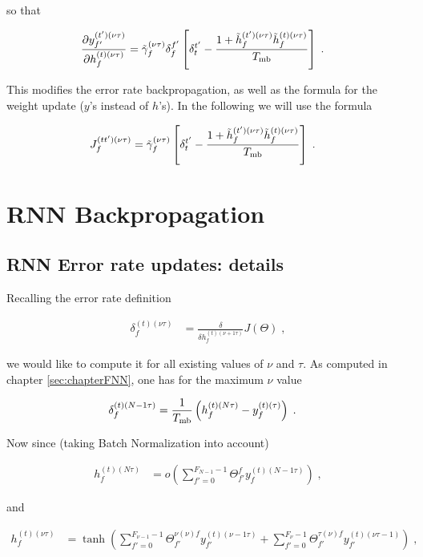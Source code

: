 \begin{subappendices}
so that

\begin{align}
\frac{\partial y_{f'}^{(t')(\nu\tau)}}{\partial h_{f}^{(t)(\nu\tau)}}&=
%
\tilde{\gamma}^{(\nu\tau)}_f \delta^{f'}_f\left[\delta^{t'}_t-
%
\frac{1+\tilde{h}_{f}^{(t')(\nu\tau)}\tilde{h}_{f}^{(t)(\nu\tau)}}{T_{{\rm mb}}}\right]\;.
\end{align}

This modifies the error rate backpropagation, as well as the formula for the weight update ($y$'s instead of $h$'s). In the following we will use the formula

\begin{align}
J^{(tt')(\nu\tau)}_{f}&=
%
\tilde{\gamma}^{(\nu\tau)}_f \left[\delta^{t'}_t-
%
\frac{1+\tilde{h}_{f}^{(t')(\nu\tau)}\tilde{h}_{f}^{(t)(\nu\tau)}}{T_{{\rm mb}}}\right]\;.
\end{align}


\section{RNN Backpropagation}

\subsection{RNN Error rate updates: details} \label{sec:rnnappenderrorrate}

Recalling the error rate definition

\begin{align}
\delta^{(t)( \nu\tau)}_f&=\frac{\delta}{\delta h^{(t)( \nu+1\tau)}_f }J(\Theta)\;,
\end{align}

we would like to compute it for all existing values of $\nu$ and $\tau$. As computed in chapter \ref{sec:chapterFNN}, one has for the maximum $\nu$ value

\begin{align}
\delta^{(t)(N-1\tau)}_f&= \frac{1}{T_{{\rm mb}}}\left(h_{f}^{(t)(N\tau)}-y_f^{(t)(\tau)}\right)\;.
\end{align}

Now since (taking Batch Normalization into account)

\begin{align}
h^{(t)(N\tau)}_{f}&=o\left(\sum_{f'=0}^{F_{N-1}-1}\Theta^f_{f'} y^{(t)(N-1\tau)}_{f}\right)\;,
\end{align}

and 

\begin{align}
h^{(t)(\nu\tau)}_f&=\tanh\left(\sum_{f'=0}^{F_{{\nu-1}}-1}\Theta^{\nu(\nu)f}_{f'}
%
y^{(t)(\nu-1\tau)}_{f'}+\sum_{f'=0}^{F_{{\nu}}-1}\Theta^{\tau(\nu)f}_{f'}
%
y^{(t)(\nu\tau-1)}_{f'}\right)\;,
\end{align}


\end{subappendices}
